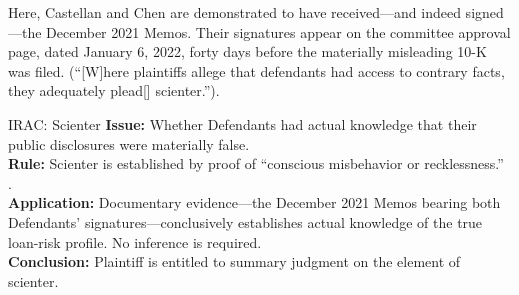 Here, Castellan and Chen are demonstrated to have received---and indeed signed---the December 2021 Memos. Their signatures appear on the committee approval page, dated January 6, 2022, forty days before the materially misleading 10-K was filed.  (``[W]here plaintiffs allege that defendants had access to contrary facts, they adequately plead[] scienter.'').

\begin{iracblock}{IRAC: Scienter}
\textbf{Issue:} Whether Defendants had actual knowledge that their public disclosures were materially false.\\[4pt]
\textbf{Rule:} Scienter is established by proof of ``conscious misbehavior or recklessness.'' .\\[4pt]
\textbf{Application:} Documentary evidence---the December 2021 Memos bearing both Defendants' signatures---conclusively establishes actual knowledge of the true loan-risk profile. No inference is required.\\[4pt]
\textbf{Conclusion:} Plaintiff is entitled to summary judgment on the element of scienter.
\end{iracblock}
